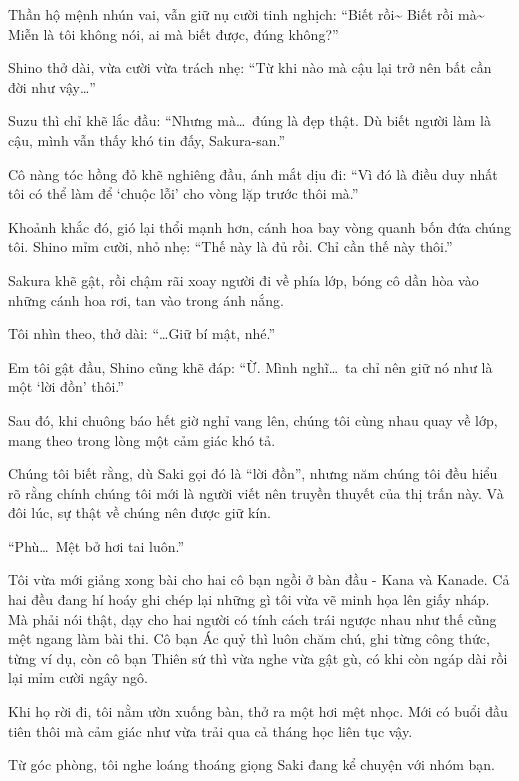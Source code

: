 \documentclass[../main.tex]{subfiles}
\begin{document}
Thần hộ mệnh nhún vai, vẫn giữ nụ cười tinh nghịch: ``Biết rồi\~{} Biết rồi mà\~{} Miễn là tôi không nói, ai mà biết được, đúng không?''

Shino thở dài, vừa cười vừa trách nhẹ: ``Từ khi nào mà cậu lại trở nên bất cần đời như vậy\dots''

Suzu thì chỉ khẽ lắc đầu: ``Nhưng mà\dots\ đúng là đẹp thật. Dù biết người làm là cậu, mình vẫn thấy khó tin đấy, Sakura-san.''

Cô nàng tóc hồng đỏ khẽ nghiêng đầu, ánh mắt dịu đi: ``Vì đó là điều duy nhất tôi có thể làm để `chuộc lỗi' cho vòng lặp trước thôi mà.''

Khoảnh khắc đó, gió lại thổi mạnh hơn, cánh hoa bay vòng quanh bốn đứa chúng tôi. Shino mỉm cười, nhỏ nhẹ: ``Thế này là đủ rồi. Chỉ cần thế này thôi.''

Sakura khẽ gật, rồi chậm rãi xoay người đi về phía lớp, bóng cô dần hòa vào những cánh hoa rơi, tan vào trong ánh nắng.

Tôi nhìn theo, thở dài: ``\dots Giữ bí mật, nhé.''

Em tôi gật đầu, Shino cũng khẽ đáp: ``Ừ. Mình nghĩ\dots\ ta chỉ nên giữ nó như là một `lời đồn' thôi.''

Sau đó, khi chuông báo hết giờ nghỉ vang lên, chúng tôi cùng nhau quay về lớp, mang theo trong lòng một cảm giác khó tả.

Chúng tôi biết rằng, dù Saki gọi đó là ``lời đồn'', nhưng năm chúng tôi đều hiểu rõ rằng chính chúng tôi mới là người viết nên truyền thuyết của thị trấn này. Và đôi lúc, sự thật về chúng nên được giữ kín.

\ct


``Phù\dots\ Mệt bở hơi tai luôn.''

Tôi vừa mới giảng xong bài cho hai cô bạn ngồi ở bàn đầu - Kana và Kanade. Cả hai đều đang hí hoáy ghi chép lại những gì tôi vừa vẽ minh họa lên giấy nháp. Mà phải nói thật, dạy cho hai người có tính cách trái ngược nhau như thế cũng mệt ngang làm bài thi. Cô bạn Ác quỷ thì luôn chăm chú, ghi từng công thức, từng ví dụ, còn cô bạn Thiên sứ thì vừa nghe vừa gật gù, có khi còn ngáp dài rồi lại mỉm cười ngây ngô.

Khi họ rời đi, tôi nằm ườn xuống bàn, thở ra một hơi mệt nhọc. Mới có buổi đầu tiên thôi mà cảm giác như vừa trải qua cả tháng học liên tục vậy.

Từ góc phòng, tôi nghe loáng thoáng giọng Saki đang kể chuyện với nhóm bạn.
\end{document}
